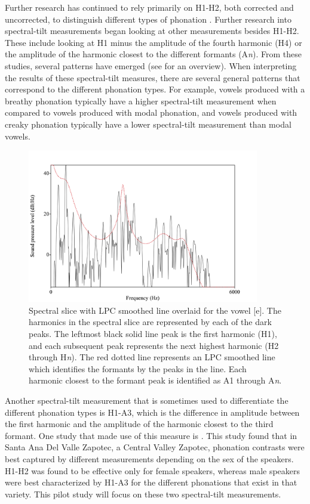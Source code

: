 \documentclass[12pt, letterpaper]{article}
\begin{document}
Further research has continued to rely primarily on H1-H2, both corrected and uncorrected, to distinguish different types of phonation \citep[e.g.,][]{huffmanMeasuresPhonationType1987,klattAnalysisSynthesisPerception1990}. Further research into spectral-tilt measurements began looking at other measurements besides H1-H2. These include looking at H1 minus the amplitude of the fourth harmonic (H4) or the amplitude of the harmonic closest to the different formants (A\textit{n}). 
From these studies, several patterns have emerged (see \cite{garellekPhoneticsVoice2019} for an overview). When interpreting the results of these spectral-tilt measures, there are several general patterns that correspond to the different phonation types. For example, vowels produced with a breathy phonation typically have a higher spectral-tilt measurement when compared to vowels produced with modal phonation, and vowels produced with creaky phonation typically have a lower spectral-tilt measurement than modal vowels. 

\begin{figure}[!h]
	\centering
	\includegraphics[width=0.9\textwidth]{Images/Harmonics.png}
	\caption{Spectral slice with LPC smoothed line overlaid for the vowel [e]. The harmonics in the spectral slice are represented by each of the dark peaks. The leftmost black solid line peak is the first harmonic (H1), and each subsequent peak represents the next highest harmonic (H2 through H\textit{n}). The red dotted line represents an LPC smoothed line which identifies the formants by the peaks in the line. Each harmonic closest to the formant peak is identified as A1 through A\textit{n}.}
	\label{fig:Harmonics}
\end{figure}

Another spectral-tilt measurement that is sometimes used to differentiate the different phonation types is H1-A3, which is the difference in amplitude between the first harmonic and the amplitude of the harmonic closest to the third formant. One study that made use of this measure is \cite{espositoVariationContrastivePhonation2010}. This study found that in Santa Ana Del Valle Zapotec, a Central Valley Zapotec, phonation contrasts were best captured by different measurements depending on the sex of the speakers. H1-H2 was found to be effective only for female speakers, whereas male speakers were best characterized by H1-A3 for the different phonations that exist in that variety. This pilot study will focus on these two spectral-tilt measurements.
\end{document}
